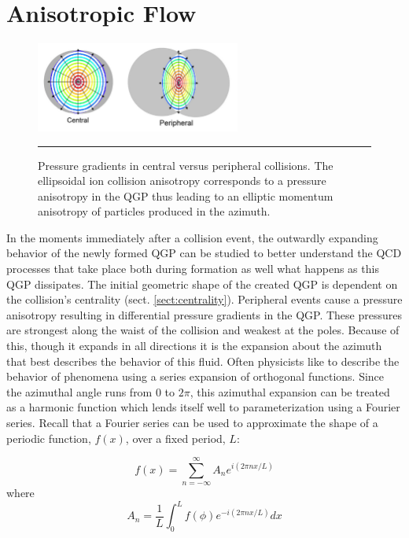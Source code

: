 
\chapter{Anisotropic Flow} %
\label{sect:flow}
\begin{figure}[htbp!]
  \centering
    \includegraphics[width=0.6\textwidth]{Figures/pressuregradientsvscent.jpg}
    
        \rule{35em}{0.5pt}
  \caption[Pressure gradients in central versus peripheral collisions.]{Pressure gradients in central versus peripheral collisions. The ellipsoidal ion collision anisotropy corresponds to a pressure anisotropy in the QGP thus leading to an elliptic momentum anisotropy of particles produced in the azimuth.}
  \label{fig:pressuregradients}
\end{figure}


In the moments immediately after a collision event, the outwardly expanding behavior of the newly formed QGP can be studied to better understand the QCD processes that take place both during formation as well what happens as this QGP dissipates. The initial geometric shape of the created QGP is dependent on the collision's centrality (sect. \ref{sect:centrality}). Peripheral events cause a pressure anisotropy resulting in differential pressure gradients in the QGP. These pressures are strongest along the waist of the collision and weakest at the poles. Because of this, though it expands in all directions it is the expansion about the azimuth that best describes the behavior of this fluid. Often physicists like to describe the behavior of phenomena using a series expansion of orthogonal functions. Since the azimuthal angle runs from $0$ to $2 \pi$, this azimuthal expansion can be treated as a harmonic function which lends itself well to parameterization using a Fourier series. Recall that a Fourier series can be used to approximate the shape of a periodic function, $f(x)$, over a fixed period, $L$:

\begin{equation}
f(x) = \sum^{\infty}_{n=-\infty} A_{n} e^{i(2 \pi n x / L)}
\end{equation}
where
\begin{equation}
A_{n} = \frac{1}{L} \int^{L}_{0} f(\phi) e^{-i(2 \pi n x / L)} dx
\end{equation}

